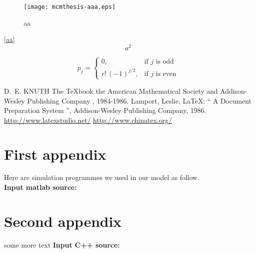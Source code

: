 \documentclass{mcmthesis}
\begin{document}
\begin{figure}[h]
  \small
  \centering
  \texttt{[image: mcmthesis-aaa.eps]}
  \caption{aa} \label{fig:aa}
\end{figure}

\lipsum[8] \eqref{aa}
\begin{equation}
  a^2 \label{aa}
\end{equation}


\[
  p_{j}=\begin{cases} 0,              & \text{if $j$ is odd}  \\
    r!\,(-1)^{j/2}, & \text{if $j$ is even}
  \end{cases}
\]

\begin{thebibliography}{99}
   D.~E. KNUTH   The \TeX{}book  the American
  Mathematical Society and Addison-Wesley
  Publishing Company , 1984-1986.
  Lamport, Leslie,  \LaTeX{}: `` A Document Preparation System '',
  Addison-Wesley Publishing Company, 1986.
  \url{http://www.latexstudio.net/}
  \url{http://www.chinatex.org/}
\end{thebibliography}

\begin{appendices}

  \section{First appendix}

  \lipsum[13]

  Here are simulation programmes we used in our model as follow.\\

  \textbf{\textcolor[rgb]{0.98,0.00,0.00}{Input matlab source:}}
  

  \section{Second appendix}

  some more text \textcolor[rgb]{0.98,0.00,0.00}{\textbf{Input C++ source:}}
  

\end{appendices}
\end{document}
